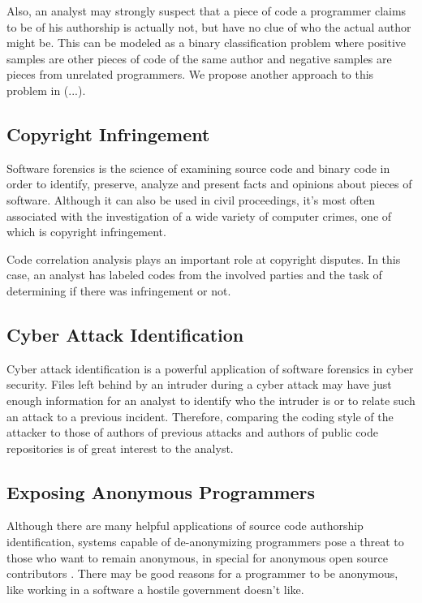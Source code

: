 Also, an analyst may strongly suspect that a piece of code a programmer claims to be of his authorship is actually not, but have no clue of who the actual author might be. This can be modeled as a binary classification problem where positive samples are other pieces of code of the same author and negative samples are pieces from unrelated programmers. We propose another approach to this problem in (...). %

\subsection{Copyright Infringement}

Software forensics is the science of examining source code and binary code in order to identify, preserve, analyze and present facts and opinions about pieces of software. Although it can also be used in civil proceedings, it's most often associated with the investigation of a wide variety of computer crimes, one of which is copyright infringement.

Code correlation analysis plays an important role at copyright disputes. In this case, an analyst has labeled codes from the involved parties and the task of determining if there was infringement or not.

\subsection{Cyber Attack Identification}

Cyber attack identification is a powerful application of software forensics in cyber security. Files left behind by an intruder during a cyber attack may have just enough information for an analyst to identify who the intruder is or to relate such an attack to a previous incident. Therefore, comparing the coding style of the attacker to those of authors of previous attacks and authors of public code repositories is of great interest to the analyst.


\subsection{Exposing Anonymous Programmers}

Although there are many helpful applications of source code authorship identification, systems capable of de-anonymizing programmers pose a threat to those who want to remain anonymous, in special for anonymous open source contributors \cite{gitblame}. There may be good reasons for a programmer to be anonymous, like working in a software a hostile government doesn't like. 

